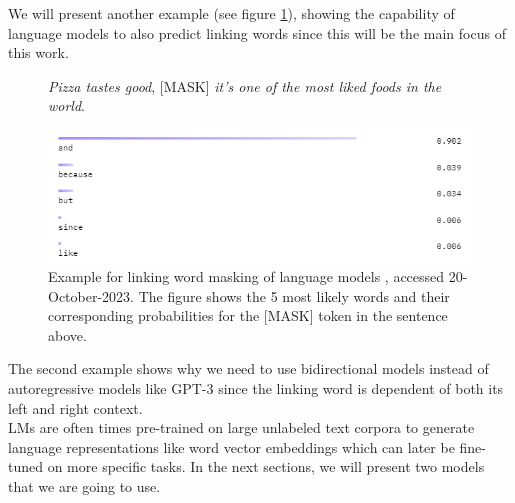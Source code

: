 We will present another example (see figure \ref{fig:bert_masking_example2}), showing the capability of language models to also predict linking words since this will be the main focus of this work.

\begin{figure}[H]
  \begin{center}
	\textit{Pizza tastes good}, [MASK] \textit{it's one of the most liked foods in the world}.
  \end{center}
  \centering
  \includegraphics[scale=0.9]{fig/bert_masking_example2.png}
  \caption{Example for linking word masking of language models \cite{bertbaseuncased}, accessed 20-October-2023. The figure shows the 5 most likely words and their corresponding probabilities for the [MASK] token in the sentence above.}%
  \label{fig:bert_masking_example2}
\end{figure}

The second example shows why we need to use bidirectional models instead of autoregressive models like GPT-3 since the linking word is dependent of both its left and right context. \\
LMs are often times pre-trained on large unlabeled text corpora to generate language representations like word vector embeddings which can later be fine-tuned on more specific tasks. In the next sections, we will present two models that we are going to use.


